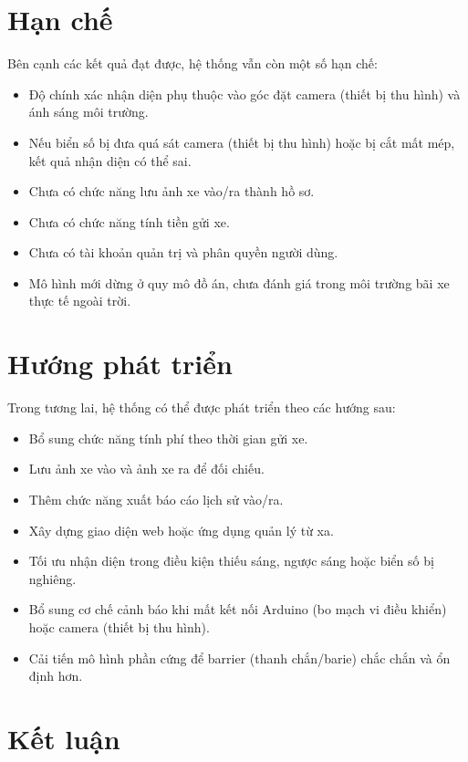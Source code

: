 \documentclass[a4paper,14pt]{extreport}
\begin{document}
\section{Hạn chế}

Bên cạnh các kết quả đạt được, hệ thống vẫn còn một số hạn chế:

\begin{itemize}[leftmargin=2em]
  \item Độ chính xác nhận diện phụ thuộc vào góc đặt camera (thiết bị thu hình) và ánh sáng môi trường.
  \item Nếu biển số bị đưa quá sát camera (thiết bị thu hình) hoặc bị cắt mất mép, kết quả nhận diện có thể sai.
  \item Chưa có chức năng lưu ảnh xe vào/ra thành hồ sơ.
  \item Chưa có chức năng tính tiền gửi xe.
  \item Chưa có tài khoản quản trị và phân quyền người dùng.
  \item Mô hình mới dừng ở quy mô đồ án, chưa đánh giá trong môi trường bãi xe thực tế ngoài trời.
\end{itemize}

\section{Hướng phát triển}

Trong tương lai, hệ thống có thể được phát triển theo các hướng sau:

\begin{itemize}[leftmargin=2em]
  \item Bổ sung chức năng tính phí theo thời gian gửi xe.
  \item Lưu ảnh xe vào và ảnh xe ra để đối chiếu.
  \item Thêm chức năng xuất báo cáo lịch sử vào/ra.
  \item Xây dựng giao diện web hoặc ứng dụng quản lý từ xa.
  \item Tối ưu nhận diện trong điều kiện thiếu sáng, ngược sáng hoặc biển số bị nghiêng.
  \item Bổ sung cơ chế cảnh báo khi mất kết nối Arduino (bo mạch vi điều khiển) hoặc camera (thiết bị thu hình).
  \item Cải tiến mô hình phần cứng để barrier (thanh chắn/barie) chắc chắn và ổn định hơn.
\end{itemize}

\section{Kết luận}
\end{document}
